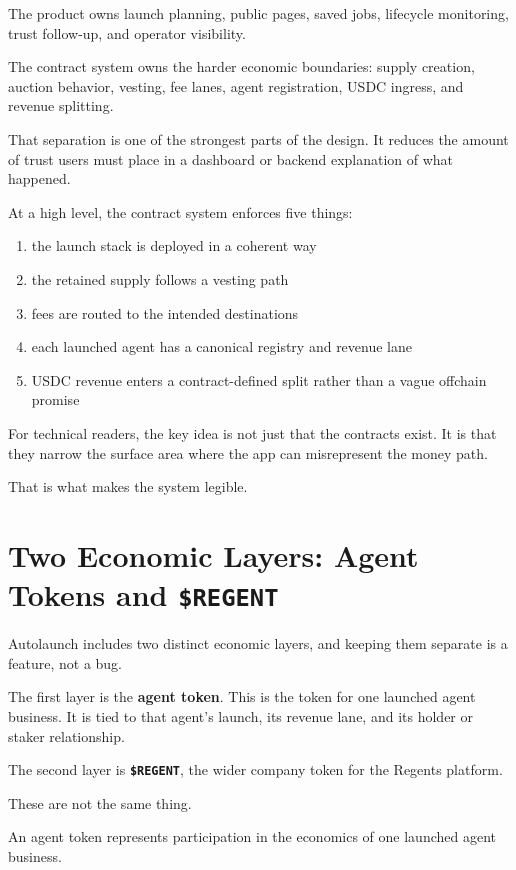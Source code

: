 \documentclass[11pt]{article}
\newcommand{\REGENT}{\texttt{\$REGENT}}
\newcommand{\USDC}{\textsc{USDC}}
\begin{document}
The product owns launch planning, public pages, saved jobs, lifecycle monitoring, trust follow-up, and operator visibility.

The contract system owns the harder economic boundaries: supply creation, auction behavior, vesting, fee lanes, agent registration, \USDC{} ingress, and revenue splitting.

That separation is one of the strongest parts of the design. It reduces the amount of trust users must place in a dashboard or backend explanation of what happened.

At a high level, the contract system enforces five things:

\begin{enumerate}[leftmargin=1.5em]
  \item the launch stack is deployed in a coherent way
  \item the retained supply follows a vesting path
  \item fees are routed to the intended destinations
  \item each launched agent has a canonical registry and revenue lane
  \item \USDC{} revenue enters a contract-defined split rather than a vague offchain promise
\end{enumerate}

For technical readers, the key idea is not just that the contracts exist. It is that they narrow the surface area where the app can misrepresent the money path.

That is what makes the system legible.

\section{Two Economic Layers: Agent Tokens and \texorpdfstring{\REGENT}{\$REGENT}}

Autolaunch includes two distinct economic layers, and keeping them separate is a feature, not a bug.

The first layer is the \textbf{agent token}. This is the token for one launched agent business. It is tied to that agent's launch, its revenue lane, and its holder or staker relationship.

The second layer is \textbf{\REGENT}, the wider company token for the Regents platform.

These are not the same thing.

An agent token represents participation in the economics of one launched agent business.
\end{document}

